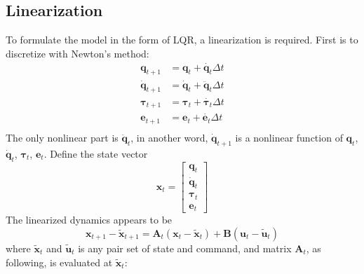 \subsection{Linearization}
To formulate the model in the form of LQR, a linearization is required. First is to discretize with Newton's method:
\begin{equation}
	\begin{split}
	\bm{q}_{t+1} &= \bm{q}_{t} + \dot{\bm{q}_{t}} \Delta t \\
	\dot{\bm{q}}_{t+1} &= \dot{\bm{q}}_{t} + \ddot{\bm{q}}_{t} \Delta t \\
	\bm{\tau}_{t+1} &= \bm{\tau}_{t} + \dot{\bm{\tau}_{t}} \Delta t \\
	\bm{e}_{t+1} &= \bm{e}_{t} + \dot{\bm{e}_{t}} \Delta t \\
	\end{split}
\end{equation}
The only nonlinear part is $\ddot{\bm{q}}_t$, in another word, $\dot{\bm{q}}_{t+1}$ is a nonlinear function of $\bm{q}_t$, $\dot{\bm{q}}_t$, ${\bm{\tau}}_t$, ${\bm{e}}_t$. Define the state vector 
\begin{equation}
	\bm{x}_t=\left[ \begin{matrix}\bm{q}_t \\ \dot{\bm{q}}_t \\ \bm{\tau}_t \\ \bm{e}_t \end{matrix} \right]
\end{equation}
The linearized dynamics appears to be
\begin{equation}
	\bm{x}_{t+1} - \tilde{\bm{x}}_{t+1} = \bm{A}_t (\bm{x}_t - \tilde{\bm{x}}_{t}) + \bm{B}(\bm{u}_t - \tilde{\bm{u}}_t)
\end{equation}
where $\tilde{\bm{x}}_t$ and $\tilde{\bm{u}}_t$ is any pair set of state and command, and matrix $\bm{A}_t$, as following, is evaluated at $\tilde{\bm{x}}_t$:

